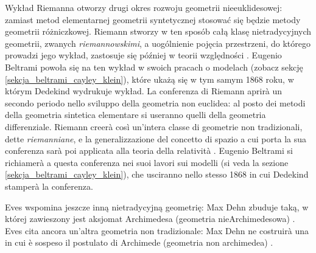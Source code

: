 Wykład Riemanna otworzy drugi okres rozwoju geometrii nieeuklidesowej: zamiast metod elementarnej geometrii syntetycznej stosować się będzie metody geometrii różniczkowej. %
Riemann stworzy w ten sposób całą klasę nietradycyjnych geometrii, zwanych \emph{riemannowskimi}, a uogólnienie pojęcia przestrzeni, do którego prowadzi jego wykład, zastosuje się później w teorii względności \cite[s. 288]{eves1_1972}. %
Eugenio Beltrami powoła się na ten wykład w swoich pracach o modelach (zobacz sekcję \ref{sekcja_beltrami_cayley_klein}), które ukażą się w tym samym 1868 roku, w którym Dedekind wydrukuje wykład. %
La conferenza di Riemann aprirà un secondo periodo nello sviluppo della geometria non euclidea: al posto dei metodi della geometria sintetica elementare si useranno quelli della geometria differenziale. %
Riemann creerà così un'intera classe di geometrie non tradizionali, dette \emph{riemanniane}, e la generalizzazione del concetto di spazio a cui porta la sua conferenza sarà poi applicata alla teoria della relatività \cite[p. 288]{eves1_1972}. %
Eugenio Beltrami si richiamerà a questa conferenza nei suoi lavori sui modelli (si veda la sezione \ref{sekcja_beltrami_cayley_klein}), che usciranno nello stesso 1868 in cui Dedekind stamperà la conferenza. %

Eves wspomina jeszcze inną nietradycyjną geometrię: Max Dehn zbuduje taką, w której zawieszony jest aksjomat Archimedesa (geometria nieArchimedesowa) \cite[s. 288]{eves1_1972}. %
Eves cita ancora un'altra geometria non tradizionale: Max Dehn ne costruirà una in cui è sospeso il postulato di Archimede (geometria non archimedea) \cite[p. 288]{eves1_1972}. %
%

